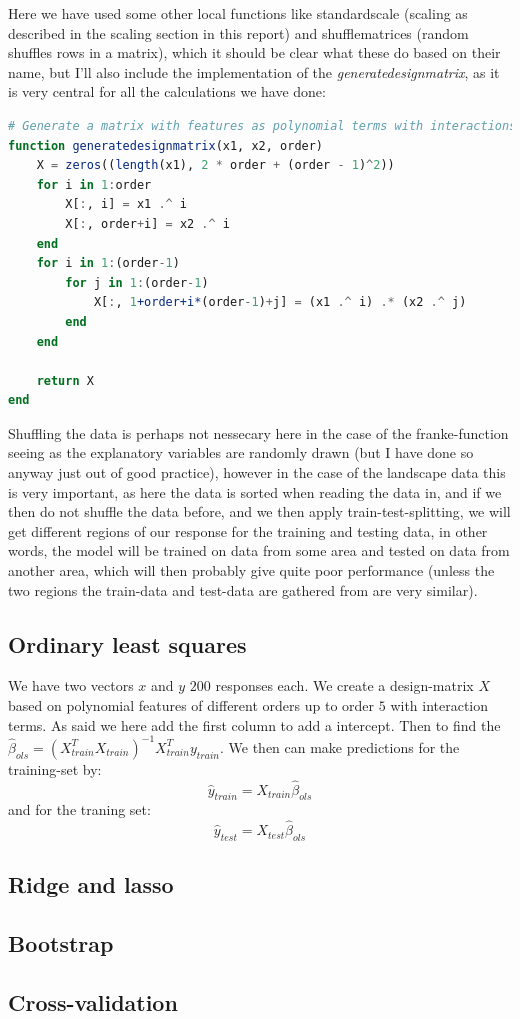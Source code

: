\documentclass{article}
\begin{document}
Here we have used some other local functions like standardscale (scaling as
described in the scaling section in this report) and shufflematrices (random
shuffles rows in a matrix), which it should be clear what these do based on
their name, but I'll also include the implementation of the
\textit{generatedesignmatrix}, as it is very central for all the calculations we
have done:
\begin{lstlisting}[language=julia]
# Generate a matrix with features as polynomial terms with interactions
function generatedesignmatrix(x1, x2, order)
    X = zeros((length(x1), 2 * order + (order - 1)^2))
    for i in 1:order
        X[:, i] = x1 .^ i
        X[:, order+i] = x2 .^ i
    end
    for i in 1:(order-1)
        for j in 1:(order-1)
            X[:, 1+order+i*(order-1)+j] = (x1 .^ i) .* (x2 .^ j)
        end
    end

    return X
end
\end{lstlisting}

Shuffling the data is perhaps not nessecary here in the case of the
franke-function seeing as the explanatory variables are randomly drawn (but I
have done so anyway just out of good practice), however in the case of the
landscape data this is very important, as here the data is sorted when reading
the data in, and if we then do not shuffle the data before, and we then apply
train-test-splitting, we will get different regions of our response for the
training and testing data, in other words, the model will be trained on data
from some area and tested on data from another area, which will then probably
give quite poor performance (unless the two regions the train-data and test-data
are gathered from are very similar).


\subsection{Ordinary least squares}
We have two vectors $x$ and $y$ $200$ responses each. We create a design-matrix
$X$ based on polynomial features of different orders up to order $5$ with
interaction terms. As said we here add the first column to add a intercept. Then
to find the $\hat{\beta}_{ols} = (X^T_{train} X_{train})^{-1} X^T_{train}
    y_{train}$. We then can make predictions for the training-set by:
$$\hat{y}_{train} = X_{train} \hat{\beta}_{ols}$$
and for the traning set:
$$\hat{y}_{test} = X_{test} \hat{\beta}_{ols}$$

\subsection{Ridge and lasso}

\subsection{Bootstrap}

\subsection{Cross-validation}


\end{document}
